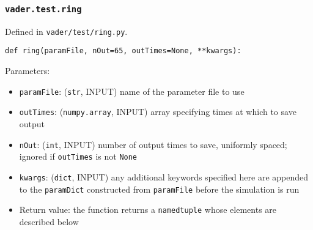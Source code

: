 \documentclass[12pt]{article}
\begin{document}
\subsubsection{\texttt{vader.test.ring}}
\label{sssec:vader.test.ring}

Defined in \verb=vader/test/ring.py=.

\begin{verbatim}
def ring(paramFile, nOut=65, outTimes=None, **kwargs):
\end{verbatim}

Parameters:
\begin{itemize}
\item \texttt{paramFile}: (\texttt{str}, INPUT) name of the parameter file to use
\item \texttt{outTimes}: (\texttt{numpy.array}, INPUT) array specifying times at which to save output
\item \texttt{nOut}: (\texttt{int}, INPUT) number of output times to save, uniformly spaced; ignored if \texttt{outTimes} is not \texttt{None}
\item \verb=kwargs=: (\verb=dict=, INPUT) any additional keywords specified here are appended to the \texttt{paramDict} constructed from \texttt{paramFile} before the simulation is run
\item Return value: the function returns a \texttt{namedtuple} whose elements are described below
\end{itemize}
\end{document}
